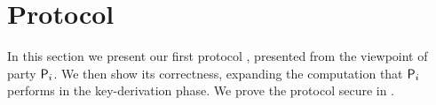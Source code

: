 \section{Protocol}\label{sec:protocol}
In this section we present our first protocol , presented from the viewpoint of party $\User[i]$.
We then show its correctness, expanding the computation that $\User[i]$ performs in the key-derivation phase.
We prove the protocol secure  in .


%
